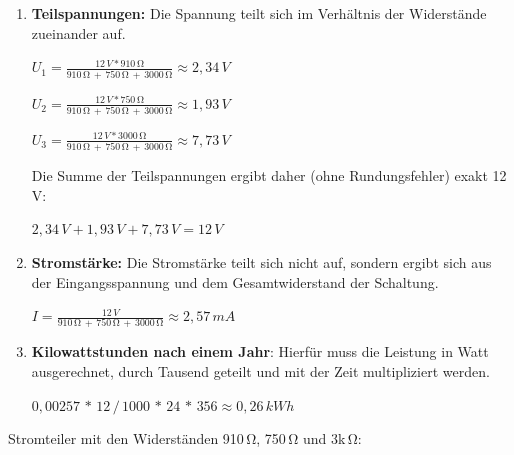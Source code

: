 \begin{enumerate}
    \item \textbf{Teilspannungen:}
    Die Spannung teilt sich im Verhältnis der Widerstände zueinander auf.

    $U_1 = \frac{12\,V * 910\,\si{\ohm}}{910\,\si{\ohm} \,+\, 750\,\si{\ohm} \,+\, 3000\,\si{\ohm}} \approx 2,34\,V$

    $U_2 = \frac{12\,V * 750\,\si{\ohm}}{910\,\si{\ohm} \,+\, 750\,\si{\ohm} \,+\, 3000\,\si{\ohm}} \approx 1,93\,V$

    $U_3 = \frac{12\,V * 3000\,\si{\ohm}}{910\,\si{\ohm} \,+\, 750\,\si{\ohm} \,+\, 3000\,\si{\ohm}} \approx 7,73\,V$

    Die Summe der Teilspannungen ergibt daher (ohne Rundungsfehler) exakt 12\,V:

    $2,34\,V + 1,93\,V + 7,73\,V = 12\,V$

    \item \textbf{Stromstärke:} Die Stromstärke teilt sich nicht auf, sondern ergibt sich
    aus der Eingangsspannung und dem Gesamtwiderstand der Schaltung.

    $I = \frac{12\,V}{910\,\si{\ohm} \,+\, 750\,\si{\ohm} \,+\, 3000\,\si{\ohm}} \approx 2,57\,mA$

    \item \textbf{Kilowattstunden nach einem Jahr}:
    Hierfür muss die Leistung in Watt ausgerechnet, durch Tausend geteilt und mit
    der Zeit multipliziert werden.

    $0,00257 \,*\, 12 \,/\, 1000 \,*\, 24 \,*\, 356 \approx 0,26\,kWh$
\end{enumerate}

\teilaufgabe
Stromteiler mit den Widerständen 910\,\si{\ohm}, 750\,\si{\ohm} und 3k\,\si{\ohm}:

